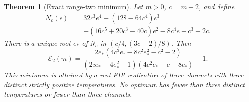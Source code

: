\documentclass[11pt]{article}
\newtheorem{theorem}{Theorem}
\begin{document}
\begin{theorem}[Exact range-two minimum]\label{range2exact}
Let $m>0$, $c=m+2$, and define
\begin{align*}
N_c(e)={}&32c^3e^4+(128-64c^4)e^3\\
&+(16c^5+20c^3-40c)e^2-8c^4e+c^3+2c.
\end{align*}
There is a unique root $e_*$ of $N_c$ in $(c/4,(3c-2)/8)$. Then
\begin{equation}\label{range2value}
\mathcal E_2(m)=\frac{2e_*(4c^3e_*-8c^2e_*^2-c^2-2)}{(2ce_*-4e_*^2-1)(4c^2e_*-c+8e_*)}-1.
\end{equation}
This minimum is attained by a real FIR realization of three channels with three distinct strictly positive temperatures. No optimum has fewer than three distinct temperatures or fewer than three channels.
\end{theorem}
\end{document}
